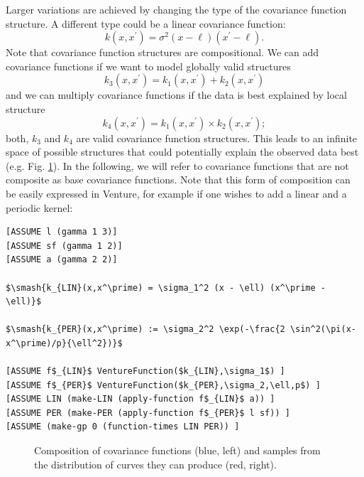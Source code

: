 \documentclass{article} %
\begin{document}
Larger variations are achieved by changing the type of the covariance function structure. A different type could be a linear covariance function:
\begin{equation}
 k(x,x^\prime) = \sigma^2 (x-\ell) (x^\prime-\ell). 
\end{equation}
Note that covariance function structures are compositional. We can add covariance functions if we want to model globally valid structures
\begin{equation}
k_3(x,x^\prime) = k_1(x,x^\prime) + k_2(x,x^\prime)
\end{equation}
 and we can multiply covariance functions if the data is best explained by local structure 
\begin{equation}
k_4(x,x^\prime) = k_1(x,x^\prime) \times k_2(x,x^\prime);
\end{equation}
both, $k_3$ and $k_4$ are valid covariance function structures. This leads to an infinite space of possible structures that could potentially explain the observed data best (e.g. Fig. \ref{fig:composite}). In the following, we will refer to covariance functions that are not composite as base covariance functions. Note that this form of composition can be easily expressed in Venture, for example if one wishes to add a linear and a periodic kernel:

\begin{minipage}{\linewidth}

\begin{lstlisting}[frame=single,label=alg:gpNeal,caption=LIN $\times$ PER,mathescape]
[ASSUME l (gamma 1 3)]
[ASSUME sf (gamma 1 2)]
[ASSUME a (gamma 2 2)]

$\smash{k_{LIN}(x,x^\prime) = \sigma_1^2 (x - \ell) (x^\prime - \ell)}$

$\smash{k_{PER}(x,x^\prime) := \sigma_2^2 \exp(-\frac{2 \sin^2(\pi(x-x^\prime)/p}{\ell^2})}$

[ASSUME f$_{LIN}$ VentureFunction($k_{LIN},\sigma_1$) ]
[ASSUME f$_{PER}$ VentureFunction($k_{PER},\sigma_2,\ell,p$) ]
[ASSUME LIN (make-LIN (apply-function f$_{LIN}$ a)) ]
[ASSUME PER (make-PER (apply-function f$_{PER}$ l sf)) ]
[ASSUME (make-gp 0 (function-times LIN PER)) ]
\end{lstlisting}

\end{minipage}




\begin{figure}[p]
\centering
    
    \caption{Composition of covariance functions (blue, left) and samples from the distribution of curves they can produce (red, right).}\label{fig:composite}
\end{figure}
\end{document}
